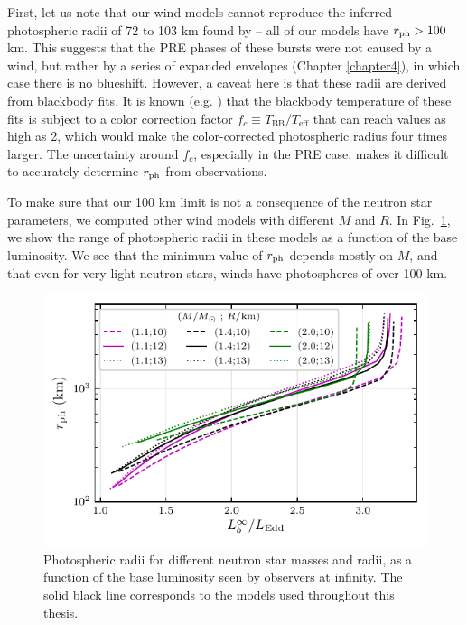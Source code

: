 \documentclass[../main.tex]{subfiles}
\begin{document}
First, let us note that our wind models cannot reproduce the inferred photospheric radii of 72 to 103 km found by \citet{Strohmayer2019} -- all of our models have $r_\text{ph}>100$ km. This suggests that the PRE phases of these bursts were not caused by a wind, but rather by a series of expanded envelopes (Chapter \ref{chapter4}), in which case there is no blueshift. However, a caveat here is that these radii are derived from blackbody fits. It is known (e.g. \citet{Galloway2017}) that the blackbody temperature of these fits is subject to a color correction factor $f_c\equiv T_\text{BB}/T_\text{eff}$ that can reach values as high as 2, which would make the color-corrected photospheric radius four times larger. The uncertainty around $f_c$, especially in the PRE case, makes it difficult to accurately determine $r_\text{ph}$ from observations.

To make sure that our 100 km limit is not a consequence of the neutron star parameters, we computed other wind models with different $M$ and $R$. In Fig.~\ref{fig:spot_check_rphot}, we show the range of photospheric radii in these models as a function of the base luminosity. We see that the minimum value of $r_\text{ph}$ depends mostly on $M$, and that even for very light neutron stars, winds have photospheres of over 100 km.

\begin{figure}
    \centering
    \includegraphics{figures/spot_check_rphot.pdf}
    \caption[Photospheres of winds in different neutron stars]{Photospheric radii for different neutron star masses and radii, as a function of the base luminosity seen by observers at infinity. The solid black line corresponds to the models used throughout this thesis.}
    \label{fig:spot_check_rphot}
\end{figure}
\end{document}
